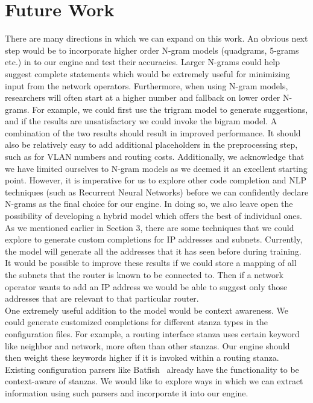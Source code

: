 \section{Future Work}
There are many directions in which we can expand on this work. An obvious next step would be to incorporate higher order N-gram models (quadgrams, 5-grams etc.) in to our engine and test their accuracies. Larger N-grams could help suggest complete statements which would be extremely useful for minimizing input from the network operators. Furthermore, when using N-gram models, researchers will often start at a higher number and fallback on lower order N-grams. For example, we could first use the trigram model to generate suggestions, and if the results are unsatisfactory we could invoke the bigram model. A combination of the two results should result in improved performance. It should also be relatively easy to add additional placeholders in the preprocessing step, such as for VLAN numbers and routing costs. Additionally, we acknowledge that we have limited ourselves to N-gram models as we deemed it an excellent starting point. However, it is imperative for us to explore other code completion and NLP techniques (such as Recurrent Neural Networks) before we can confidently declare N-grams as the final choice for our engine. In doing so, we also leave open the possibility of developing a hybrid model which offers the best of individual ones.\\

As we mentioned earlier in Section 3, there are some techniques that we could explore to generate custom completions for IP addresses and subnets. Currently, the model will generate all the addresses that it has seen before during training. It would be possible to improve these results if we could store a mapping of all the subnets that the router is known to be connected to. Then if a network operator wants to add an IP address we would be able to suggest only those addresses that are relevant to that particular router.\\

One extremely useful addition to the model would be context awareness. We could generate customized completions for different stanza types in the configuration files. For example, a routing interface stanza uses certain keyword like neighbor and network, more often than other stanzas. Our engine should then weight these keywords higher if it is invoked within a routing stanza. Existing configuration parsers like Batfish~\cite{batfish} already have the functionality to be context-aware of stanzas. We would like to explore ways in which we can extract information using such parsers and incorporate it into our engine.\\ 

